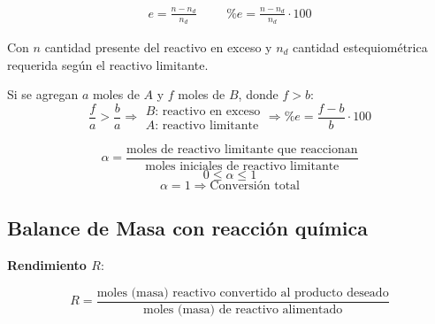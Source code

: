             
            \begin{equation}
            \label{eq:exceso}
                \begin{matrix}
                     e = \frac{n - n_{d}}{n_{d}} & & & \%e = \frac{n - n_{d}}{n_{d}} \cdot 100
                \end{matrix}
            \end{equation}
            
            Con \(n\) cantidad presente del reactivo en exceso y \(n_{d}\) cantidad estequiométrica requerida según el reactivo limitante.
            
            Si se agregan \(a\) moles de \(A\) y \(f\) moles de \(B\), donde \(f > b\):
            \[\frac{f}{a} > \frac{b}{a} \Rightarrow
            \begin{matrix}
                 B\text{: reactivo en exceso} \\
                 A\text{: reactivo limitante}
            \end{matrix}
            \Rightarrow \%e = \frac{f - b}{b} \cdot 100
            \]
            
            
            \begin{quote}
                \textit{}
            \end{quote}
            
            \[\alpha = \frac{\text{moles de reactivo limitante que reaccionan}}{\text{moles iniciales de reactivo limitante}}\]
            \[0 \leq \alpha \leq 1\]
            \[\alpha = 1 \Rightarrow \text{Conversión total}\]
    
    \subsection{Balance de Masa con reacción química}
    
    \textbf{Rendimiento \(R\)}:
    \begin{quote}
        \textit{}
    \end{quote}
    \[R = \frac{\text{moles (masa) reactivo convertido al producto deseado}}{\text{moles (masa) de reactivo alimentado}}\]
    \newpage
    
